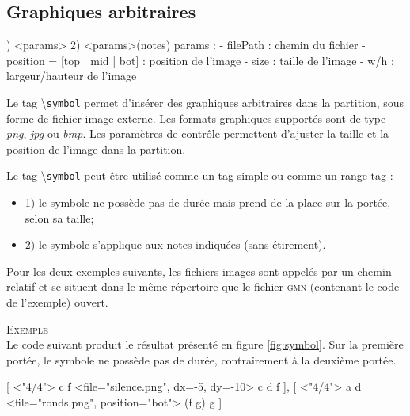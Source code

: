 \documentclass{article}
\newenvironment{gmncode}	{\vspace{-2mm}\small\verbatim}{\endverbatim\vspace{-2mm}}
\newcommand{\gmn}			{\textsc{gmn}}
\newcommand{\code}[1]		{{\small \texttt{#1}}}
\newcommand{\guidotag}[1]	{\textbackslash\code{#1}}
\newcommand{\exemple}		{\vspace{2mm}\hspace*{-6mm}\textsc{Exemple}}
\begin{document}
\subsection{Graphiques arbitraires}\label{subsec:graphiquesAbstraites}
\bigskip

\begin{gmncode}
1) \symbol<params>
2) \symbol<params>(notes)
  params : 
    - filePath : chemin du fichier
    - position = [top | mid | bot] :
      position de l'image
    - size : taille de l'image
    - w/h : largeur/hauteur de l'image
\end{gmncode}

Le tag \guidotag{symbol} permet d'insérer des graphiques arbitraires dans la partition, sous forme de fichier image externe. Les formats graphiques supportés sont de type \emph{png}, \emph{jpg} ou \emph{bmp}. Les paramètres de contrôle permettent d'ajuster la taille et la position de l'image dans la partition.

Le tag \guidotag{symbol} peut être utilisé comme un tag simple ou comme un range-tag :
\begin{itemize}
	\item 1) le symbole ne possède pas de durée mais prend de la place sur la portée, selon sa taille;
	\item 2) le symbole s'applique aux notes indiquées (sans étirement).
\end{itemize}

Pour les deux exemples suivants, les fichiers images sont appelés par un chemin relatif et se situent dans le même répertoire que le fichier \gmn{} (contenant le code de l'exemple) ouvert.

\exemple\\
Le code suivant produit le résultat présenté en figure \ref{fig:symbol}. Sur la première portée, le symbole ne possède pas de durée, contrairement à la deuxième portée.

\begin{gmncode}
{
  [
    \meter<"4/4"> c f
    \symbol<file="silence.png", dx=-5,
        dy=-10> 
    c d f
  ],
  [
    \meter<"4/4"> a d
    \symbol<file="ronds.png",
        position="bot"> (f g) g
  ]
}
\end{gmncode}
\end{document}

